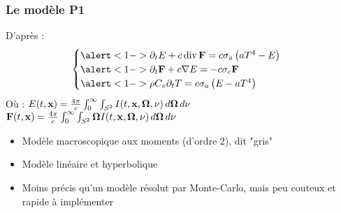 \begin{frame}
  \frametitle{Le modèle P1}
  D'après \parencite{Reference2} :
  \begingroup
  \normalsize
  \begin{equation*}
      \begin{cases}
        \alert<1->{\partial_tE + c \operatorname {div} \bvec F = c\sigma_a\left(aT^4-E\right)}\\
        \alert<1->{\partial_t\bvec{F} + c \nabla E = -c\sigma_c \bvec{F}} \\
        \alert<1->{\rho C_v \partial_t T = c \sigma_a \left(E-aT^4\right)}
      \end{cases}
  \end{equation*}
  \endgroup
Où :   %
\footnotesize
  $E(t,\textbf{x}) = \frac{4\pi}{c} \int_{0}^{\infty} \int_{S^2} I(t,\textbf{x},\bm{\Omega},\nu) \, d\bm{\Omega} \, d\nu$ \\
  \hspace*{8mm} $\textbf{F}(t,\textbf{x}) = \frac{4\pi}{c} \int_{0}^{\infty} \int_{S^2} \bm{\Omega}I(t,\textbf{x},\bm{\Omega},\nu) \, d\bm{\Omega} \, d\nu$ 
\pause
\normalsize
\begin{itemize}[<+>]
  \item Modèle macroscopique aux moments (d’ordre 2), dit "gris"
  \item Modèle linéaire et hyperbolique
  \item Moins précis qu'un modèle résolut par Monte-Carlo, mais peu couteux et rapide à implémenter
\end{itemize}

\end{frame}


